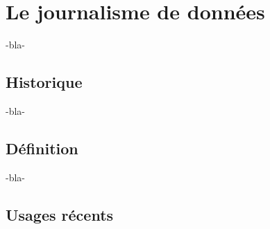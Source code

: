 
\chapter{Le journalisme de données}


-bla-

\section{Historique}


-bla-

\section{Définition}

-bla-

\section{Usages récents}
